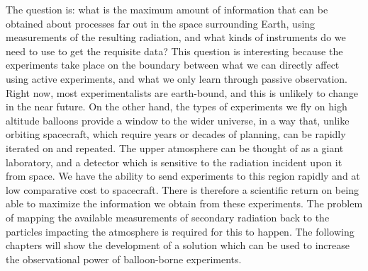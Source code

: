 The question is: what is the maximum amount of information that can be obtained about processes far out in the space surrounding Earth, using measurements of the resulting radiation, and what kinds of instruments do we need to use to get the requisite data? This question is interesting because the experiments take place on the boundary between what we can directly affect using active experiments, and what we only learn through passive observation. Right now, most experimentalists are earth-bound, and this is unlikely to change in the near future. On the other hand, the types of experiments we fly on high altitude balloons provide a window to the wider universe, in a way that, unlike orbiting spacecraft, which require years or decades of planning, can be rapidly iterated on and repeated. The upper atmosphere can be thought of as a giant laboratory, and a detector which is sensitive to the radiation incident upon it from space. We have the ability to send experiments to this region rapidly and at low comparative cost to spacecraft. There is therefore a scientific return on being able to maximize the information we obtain from these experiments. The problem of mapping the available measurements of secondary radiation back to the particles impacting the atmosphere is required for this to happen. The following chapters will show the development of a solution which can be used to increase the observational power of balloon-borne experiments.

 


